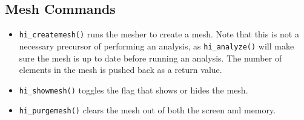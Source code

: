 \subsection{Mesh Commands}

\begin{itemize}
\item \texttt{hi\_createmesh()} runs the mesher to create a mesh. Note that this is not
a necessary precursor of performing an analysis, as
\texttt{hi\_analyze()} will make sure the mesh is up to date before
running an analysis. The number of elements in the mesh is pushed
back as a return value.

\item \texttt{hi\_showmesh()} toggles the flag that shows or hides the mesh.

\item \texttt{hi\_purgemesh()} clears the mesh out of both the screen and memory.
\end{itemize}

